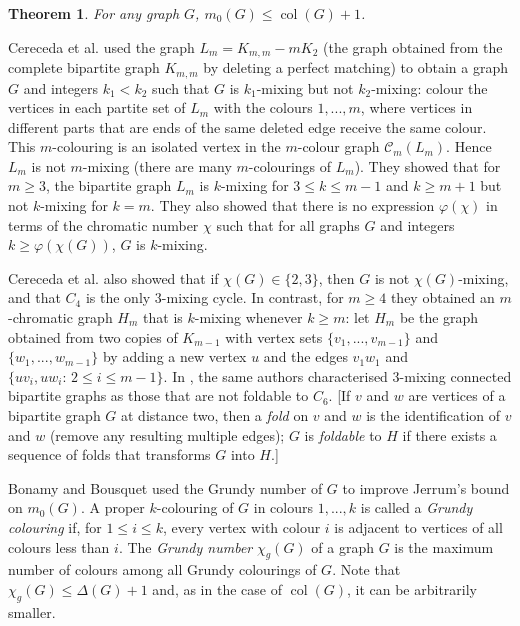 \documentclass[12pt]{article}%
\newtheorem{theorem}{Theorem}[section]
\begin{document}
\begin{theorem}
\label{Thm_colG+1}\emph{\cite{26CM-CHJ1}}\hspace{0.1in}For any graph $G$,
$m_{0}(G)\leq\operatorname{col}(G)+1$.
\end{theorem}

Cereceda et al. \cite{26CM-CHJ1} used the graph $L_{m}=K_{m,m}-mK_{2}$ (the
graph obtained from the complete bipartite graph $K_{m,m}$ by deleting a
perfect matching) to obtain a graph $G$ and integers $k_{1}<k_{2}$ such that
$G$ is $k_{1}$-mixing but not $k_{2}$-mixing: colour the vertices in each
partite set of $L_{m}$ with the colours $1,...,m$, where vertices in different
parts that are ends of the same deleted edge receive the same colour. This
$m$-colouring is an isolated vertex in the $m$-colour graph $\mathcal{C}%
_{m}(L_{m})$. Hence $L_{m}$ is not $m$-mixing (there are many $m$-colourings
of $L_{m}$). They showed that for $m\geq3$, the bipartite graph $L_{m}$ is
$k$-mixing for $3\leq k\leq m-1$ and $k\geq m+1$ but not $k$-mixing for $k=m$.
They also showed that there is no expression $\varphi(\chi)$ in terms of the
chromatic number $\chi$ such that for all graphs $G$ and integers
$k\geq\varphi(\chi(G))$, $G$ is $k$-mixing.

Cereceda et al. \cite{26CM-CHJ1} also showed that if $\chi(G)\in\{2,3\}$, then
$G$ is not $\chi(G)$-mixing, and that $C_{4}$ is the only $3$-mixing cycle. In
contrast, for $m\geq4$ they obtained an $m$-chromatic graph $H_{m}$ that is
$k$-mixing whenever $k\geq m$: let $H_{m}$ be the graph obtained from two
copies of $K_{m-1}$ with vertex sets $\{v_{1},...,v_{m-1}\}$ and
$\{w_{1},...,w_{m-1}\}$ by adding a new vertex $u$ and the edges $v_{1}w_{1}$
and $\{uv_{i},uw_{i}\colon\,2\leq i\leq m-1\}$. In \cite{26CM-CHJ2}, the same
authors characterised $3$-mixing connected bipartite graphs as those that are
not foldable to $C_{6}$. [If $v$ and $w$ are vertices of a bipartite graph $G$
at distance two, then a \emph{fold} on $v$ and $w$ is the identification of
$v$ and $w$ (remove any resulting multiple edges); $G$ is \emph{foldable} to
$H$ if there exists a sequence of folds that transforms $G$ into $H$.]

Bonamy and Bousquet \cite{26CM-BB} used the Grundy number of $G$ to improve
Jerrum's bound on $m_{0}(G)$. A proper $k$-colouring of $G$ in colours
$1,...,k$ is called a \emph{Grundy colouring} if, for $1\leq i\leq k$, every
vertex with colour $i$ is adjacent to vertices of all colours less than $i$.
The \emph{Grundy number} $\chi_{g}(G)$ of a graph $G$ is the maximum number of
colours among all Grundy colourings of $G$. Note that $\chi_{g}(G)\leq
\Delta(G)+1$ and, as in the case of $\operatorname{col}(G)$, it can be
arbitrarily smaller.
\end{document}
